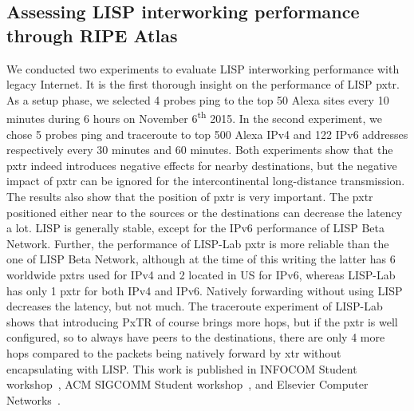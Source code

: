 \subsection{Assessing LISP interworking performance through RIPE Atlas}
We conducted two experiments to evaluate LISP interworking performance with legacy Internet. It is the first thorough insight on the performance of LISP \acrfull{pxtr}. As a setup phase, we selected 4 probes ping to the top 50 Alexa sites every 10 minutes during 6 hours on November 6\textsuperscript{th} 2015. In the second experiment, %
we chose 5 probes ping and traceroute to top 500 Alexa IPv4 and 122 IPv6 addresses respectively every 30 minutes and 60 minutes. Both experiments show that the \acrshort{pxtr} indeed introduces negative effects for nearby destinations, but the negative impact of \acrshort{pxtr} can be ignored for the intercontinental long-distance transmission. The results also show that the position of \acrshort{pxtr} is very important. The \acrshort{pxtr} positioned either near to the sources or the destinations can decrease the latency a lot. LISP is generally stable, except for the IPv6 performance of LISP Beta Network. Further, the performance of LISP-Lab \acrshort{pxtr} is more reliable than the one of LISP Beta Network, although at the time of this writing the latter has 6 worldwide \acrshort{pxtr}s used for IPv4 and 2 located in US for IPv6, whereas LISP-Lab has only 1 \acrshort{pxtr} for both IPv4 and IPv6. Natively forwarding without using LISP decreases the latency, but not much. The traceroute experiment of LISP-Lab shows that introducing PxTR of course brings more hops, but if the \acrshort{pxtr} is well configured, so to always have peers to the destinations, there are only 4 more hops compared to the packets being natively forward by \acrshort{xtr} without encapsulating with LISP. This work is published in INFOCOM Student workshop~\cite{li2016using}, ACM SIGCOMM Student workshop~\cite{li2016performance}, and Elsevier Computer Networks~\cite{Li2017}.

